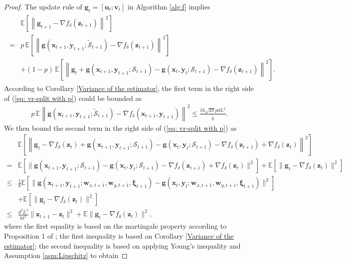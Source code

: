 \documentclass[11pt]{article}
\def\vg{\mathbf{g}}
\def\vu{\mathbf{u}}
\def\vv{\mathbf{v}}
\def\vw{\mathbf{w}}
\def\vx{\mathbf{x}}
\def\vy{\mathbf{y}}
\def\vz{\mathbf{z}}
\def\vxi{\bm{\xi}}
\def\fS{{\mathcal{S}}}
\begin{document}
\begin{proof}
The update rule of $\vg_t=[\vu_t; \vv_t]$ in Algorithm \ref{alg:f} implies
\begin{align}\label{eq: vr-split with p}
\begin{split}
& \mathbb{E} \left[\left\| \vg_{t+1} - \nabla f_\delta(\vz_{t+1}) \right\|^2\right] \\
=& p\,\mathbb{E} \left[\left\| \vg(\vx_{t+1},\vy_{t+1};\tilde\fS_{t+1}) - \nabla f_\delta(\vz_{t+1}) \right\|^2\right] \\
&+  (1-p)\,\mathbb{E} \left[\left\| \vg_t + \vg(\vx_{t+1},\vy_{t+1};\fS_{t+1})-\vg(\vx_{t},\vy_{t};\fS_{t+1}) - \nabla f_\delta(\vz_{t+1}) \right\|^2\right].
\end{split}
\end{align}
According to Corollary \ref{Variance of the estimator}, the first term in the right side of (\ref{eq: vr-split with p}) could be bounded as
\begin{align}\label{inter p}
    p\,\mathbb{E} \left\| \vg(\vx_{t+1},\vy_{t+1};\tilde\fS_{t+1}) - \nabla f_\delta(\vx_{t+1},\vy_{t+1}) \right\|^2 \le\frac{ 16\sqrt{2\pi}pdL^2}{\tilde{b}}.
\end{align}
We then bound the second term in the right side of (\ref{eq: vr-split with p}) as
\begin{align}
&  \mathbb{E} \left[\left\| \vg_t -\nabla f_\delta(\vz_{t})+ \vg(\vx_{t+1},\vy_{t+1};\fS_{t+1})-\vg(\vx_{t},\vy_{t};\fS_{t+1}) - \nabla f_\delta(\vz_{t+1})+\nabla f_\delta(\vz_{t}) \right\|^2\right] \nonumber\\
=& \mathbb{E} \left[\| \vg(\vx_{t+1},\vy_{t+1};\fS_{t+1})-\vg(\vx_{t},\vy_{t};\fS_{t+1}) - \nabla f_\delta(\vz_{t+1})+\nabla f_\delta(\vz_{t}) \|^2\right] + \mathbb{E}\left[\| \vg_t -\nabla f_\delta(\vz_{t}) \|^2\right] \nonumber \\
 \le& \frac{1}{b} \mathbb{E} \left[\| \vg(\vx_{t+1},\vy_{t+1};\vw_{x,t+1},\vw_{y,t+1},\vxi_{t+1})-\vg(\vx_{t},\vy_{t};\vw_{x,t+1},\vw_{y,t+1},\vxi_{t+1}) \|^2\right]\nonumber\\
 &+ \mathbb{E} \left[\| \vg_t -\nabla f_\delta(\vz_{t}) \|^2\right]  \nonumber \\
\le& \frac{d^2L^2}{b\delta^2} \| \vz_{t+1}-\vz_t\|^2 +\mathbb{E} \| \vg_t - \nabla f_\delta(\vz_t) \|^2, \label{inter 1-p}
\end{align}
where the first equality is based on the martingale property according to Proposition 1 of \cite{fang2018spider};
the first inequality is based on Corollary \ref{Variance of the estimator}; the second inequality is based on applying Young's inequality and Assumption \ref{asm:Lipschitz} to obtain

\end{proof}
\end{document}
